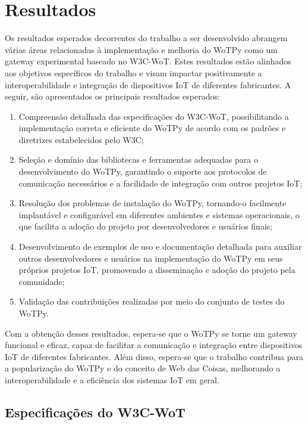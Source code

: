 \chapter{Resultados}

Os resultados esperados decorrentes do trabalho a ser desenvolvido abrangem várias áreas relacionadas à implementação e melhoria do WoTPy como um gateway experimental baseado no W3C-WoT. Estes resultados estão alinhados aos objetivos específicos do trabalho e visam impactar positivamente a interoperabilidade e integração de dispositivos IoT de diferentes fabricantes. A seguir, são apresentados os principais resultados esperados:

\begin{enumerate}
    \item Compreensão detalhada das especificações do W3C-WoT, possibilitando a implementação correta e eficiente do WoTPy de acordo com os padrões e diretrizes estabelecidos pelo W3C;
    \item Seleção e domínio das bibliotecas e ferramentas adequadas para o desenvolvimento do WoTPy, garantindo o suporte aos protocolos de comunicação necessários e a facilidade de integração com outros projetos IoT;
    \item Resolução dos problemas de instalação do WoTPy, tornando-o facilmente implantável e configurável em diferentes ambientes e sistemas operacionais, o que facilita a adoção do projeto por desenvolvedores e usuários finais;
    \item Desenvolvimento de exemplos de uso e documentação detalhada para auxiliar outros desenvolvedores e usuários na implementação do WoTPy em seus próprios projetos IoT, promovendo a disseminação e adoção do projeto pela comunidade;
    \item Validação das contribuições realizadas por meio do conjunto de testes do WoTPy.
\end{enumerate}

Com a obtenção desses resultados, espera-se que o WoTPy se torne um gateway funcional e eficaz, capaz de facilitar a comunicação e integração entre dispositivos IoT de diferentes fabricantes. Além disso, espera-se que o trabalho contribua para a popularização do WoTPy e do conceito de Web das Coisas, melhorando a interoperabilidade e a eficiência dos sistemas IoT em geral.

\section{Especificações do W3C-WoT}

